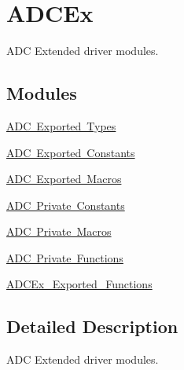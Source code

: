 \hypertarget{group___a_d_c_ex}{}\section{A\+D\+C\+Ex}
\label{group___a_d_c_ex}


A\+DC Extended driver modules.  


\subsection*{Modules}
\begin{DoxyCompactItemize}
\item 
\mbox{\hyperlink{group___a_d_c_ex___exported___types}{A\+D\+C Exported Types}}
\item 
\mbox{\hyperlink{group___a_d_c_ex___exported___constants}{A\+D\+C Exported Constants}}
\item 
\mbox{\hyperlink{group___a_d_c___exported___macros}{A\+D\+C Exported Macros}}
\item 
\mbox{\hyperlink{group___a_d_c_ex___private___constants}{A\+D\+C Private Constants}}
\item 
\mbox{\hyperlink{group___a_d_c_ex___private___macros}{A\+D\+C Private Macros}}
\item 
\mbox{\hyperlink{group___a_d_c_ex___private___functions}{A\+D\+C Private Functions}}
\item 
\mbox{\hyperlink{group___a_d_c_ex___exported___functions}{A\+D\+C\+Ex\+\_\+\+Exported\+\_\+\+Functions}}
\end{DoxyCompactItemize}


\subsection{Detailed Description}
A\+DC Extended driver modules. 

